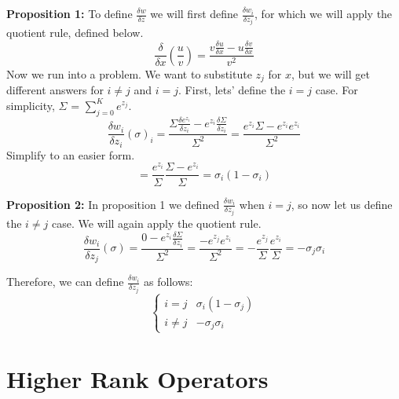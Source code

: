\documentclass{report}
\begin{document}
            \textbf{Proposition 1:}
            To define $\frac{\delta{w}}{\delta{z}}$ we will first define $\frac{\delta{w_i}}{\delta{z_j}}$, for which we will apply the quotient rule, defined below. 
            $$\frac{\delta}{\delta{x}}(\frac{u}{v}) = \frac{v\frac{\delta{u}}{\delta{x}} - u\frac{\delta{v}}{\delta{x}}}{v^2}$$
            Now we run into a problem. We want to substitute $z_j$ for $x$, but we will get different answers for $i\ne j$ and $i=j$. First, lets' define the $i=j$ case. 
            For simplicity, $\Sigma$ = $\sum_{j=0}^{K}e^{z_j}$.
            $$\frac{\delta{w_i}}{\delta{z_i}}(\sigma)_i = \frac{\Sigma \frac{\delta{e^{z_i}}}{\delta{z_i}} 
            - e^{z_i}\frac{\delta{\Sigma}}{\delta{z_i}}}{\Sigma^2} = \frac{e^{z_i}\Sigma - e^{z_i}e^{z_i}}{\Sigma^2}$$
            Simplify to an easier form. 
            $$= \frac{e^{z_i}}{\Sigma} \frac{\Sigma - e^{z_i}}{\Sigma} = \sigma_i(1 - \sigma_i)$$

            \textbf{Proposition 2:}
            In proposition 1 we defined $\frac{\delta{w_i}}{\delta{z_j}}$ when $i=j$, so now let us define the $i\ne j$ case. We will again apply the quotient rule.
            $$\frac{\delta{w_i}}{\delta{z_j}}(\sigma) = \frac{0- e^{z_i}\frac{\delta{\Sigma}}{\delta{z_i}}}{\Sigma^2} = \frac{-e^{z_j}e^{z_i}}{\Sigma^2} = 
            -\frac{e^{z_j}}{\Sigma} \frac{e^{z_i}}{\Sigma} = -\sigma_j \sigma_i$$

            Therefore, we can define $\frac{\delta{w_i}}{\delta{z_j}}$ as follows:
            \[ 
            \begin{cases} 
                i=j & \sigma_i(1 - \sigma_j) \\
                i\ne j & -\sigma_j \sigma_i
            \end{cases}
            \]


    \chapter{Higher Rank Operators}
\end{document}
